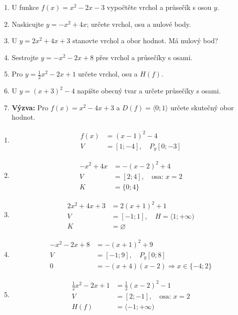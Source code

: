 \documentclass[11pt,a4paper]{article}
\begin{document}
\begin{zadaniReseniBox}[title={Domácí úkol}]
\begin{enumerate}[label=\alph*),itemsep=3pt]
\item U funkce $f(x)=x^2-2x-3$ vypočtěte vrchol a průsečík s osou $y$.
\item Naskicujte $y=-x^2+4x$; určete vrchol, osu a nulové body.
\item U $y=2x^2+4x+3$ stanovte vrchol a obor hodnot. Má nulový bod?
\item Sestrojte $y=-x^2-2x+8$ přes vrchol a průsečíky s osami.
\item Pro $y=\tfrac12x^2-2x+1$ určete vrchol, osu a $H(f)$.
\item U $y=(x+3)^2-4$ napište obecný tvar a určete průsečíky s osami.
\item \textbf{Výzva:} Pro $f(x)=x^2-4x+3$ a $D(f)=\langle0;1\rangle$ určete skutečný obor hodnot.
\end{enumerate}
\tcblower
\begin{enumerate}[label=\alph*),itemsep=4pt]
\item
\[
\begin{aligned}
f(x)&=(x-1)^2-4 \\
V&=[1;-4],\quad P_y[0;-3]
\end{aligned}
\]

\item
\[
\begin{aligned}
-x^2+4x&=-(x-2)^2+4 \\
V&=[2;4],\quad\text{osa: }x=2 \\
K&=\{0;4\}
\end{aligned}
\]

\item
\[
\begin{aligned}
2x^2+4x+3&=2(x+1)^2+1 \\
V&=[-1;1],\quad H=\langle1;+\infty) \\
K&=\varnothing
\end{aligned}
\]

\item
\[
\begin{aligned}
-x^2-2x+8&=-(x+1)^2+9 \\
V&=[-1;9],\quad P_y[0;8] \\
0&=-(x+4)(x-2)\Rightarrow x\in\{-4;2\}
\end{aligned}
\]

\item
\[
\begin{aligned}
\tfrac12x^2-2x+1&=\tfrac12(x-2)^2-1 \\
V&=[2;-1],\quad\text{osa: }x=2 \\
H(f)&=\langle-1;+\infty)
\end{aligned}
\]


\end{enumerate}
\end{zadaniReseniBox}
\end{document}
